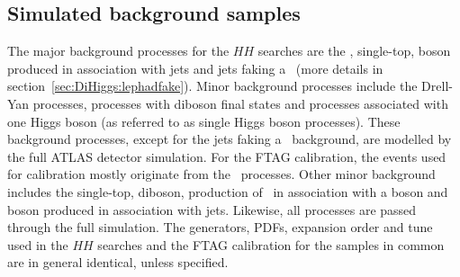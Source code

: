     


\subsection{Simulated background samples}
\label{sec:MC samples}
The major background processes for the 
$HH$ searches are the \ttbar, single-top, 
boson produced in association with jets and jets faking a 
\tauhad\ (more details in section~\ref{sec:DiHiggs:lephadfake}). 
Minor background processes include the Drell-Yan processes, 
processes with diboson final states and processes 
associated with one Higgs boson 
(as referred to as single Higgs boson processes).
These background processes, except for the jets faking a 
\tauhad\ background, are modelled by the full ATLAS 
detector simulation. 
For the FTAG calibration, the events used for calibration
mostly originate from the \ttbar\ processes. Other minor 
background includes the single-top, diboson,  
production of \ttbar\ in association with a boson 
and boson produced in association with jets. 
Likewise, all processes are passed through the 
full simulation. The generators, PDFs,
expansion order and tune used in the $HH$ searches
and the FTAG calibration for the samples in common 
are in general identical, unless specified. 

